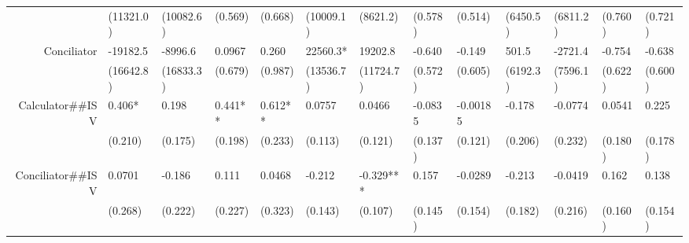 \begin{tabular}{rrrrrrrrrrrrr}
      & \multicolumn{1}{l}{(11321.0)} & \multicolumn{1}{l}{(10082.6)} & \multicolumn{1}{l}{(0.569)} & \multicolumn{1}{l}{(0.668)} & \multicolumn{1}{l}{(10009.1)} & \multicolumn{1}{l}{(8621.2)} & \multicolumn{1}{l}{(0.578)} & \multicolumn{1}{l}{(0.514)} & \multicolumn{1}{l}{(6450.5)} & \multicolumn{1}{l}{(6811.2)} & \multicolumn{1}{l}{(0.760)} & \multicolumn{1}{l}{(0.721)} \\
Conciliator & \multicolumn{1}{l}{-19182.5} & \multicolumn{1}{l}{-8996.6} & \multicolumn{1}{l}{0.0967} & \multicolumn{1}{l}{0.260} & \multicolumn{1}{l}{22560.3*} & \multicolumn{1}{l}{19202.8} & \multicolumn{1}{l}{-0.640} & \multicolumn{1}{l}{-0.149} & \multicolumn{1}{l}{501.5} & \multicolumn{1}{l}{-2721.4} & \multicolumn{1}{l}{-0.754} & \multicolumn{1}{l}{-0.638} \\
      & \multicolumn{1}{l}{(16642.8)} & \multicolumn{1}{l}{(16833.3)} & \multicolumn{1}{l}{(0.679)} & \multicolumn{1}{l}{(0.987)} & \multicolumn{1}{l}{(13536.7)} & \multicolumn{1}{l}{(11724.7)} & \multicolumn{1}{l}{(0.572)} & \multicolumn{1}{l}{(0.605)} & \multicolumn{1}{l}{(6192.3)} & \multicolumn{1}{l}{(7596.1)} & \multicolumn{1}{l}{(0.622)} & \multicolumn{1}{l}{(0.600)} \\
Calculator\#\#ISV & \multicolumn{1}{l}{0.406*} & \multicolumn{1}{l}{0.198} & \multicolumn{1}{l}{0.441**} & \multicolumn{1}{l}{0.612**} & \multicolumn{1}{l}{0.0757} & \multicolumn{1}{l}{0.0466} & \multicolumn{1}{l}{-0.0835} & \multicolumn{1}{l}{-0.00185} & \multicolumn{1}{l}{-0.178} & \multicolumn{1}{l}{-0.0774} & \multicolumn{1}{l}{0.0541} & \multicolumn{1}{l}{0.225} \\
      & \multicolumn{1}{l}{(0.210)} & \multicolumn{1}{l}{(0.175)} & \multicolumn{1}{l}{(0.198)} & \multicolumn{1}{l}{(0.233)} & \multicolumn{1}{l}{(0.113)} & \multicolumn{1}{l}{(0.121)} & \multicolumn{1}{l}{(0.137)} & \multicolumn{1}{l}{(0.121)} & \multicolumn{1}{l}{(0.206)} & \multicolumn{1}{l}{(0.232)} & \multicolumn{1}{l}{(0.180)} & \multicolumn{1}{l}{(0.178)} \\
Conciliator\#\#ISV & \multicolumn{1}{l}{0.0701} & \multicolumn{1}{l}{-0.186} & \multicolumn{1}{l}{0.111} & \multicolumn{1}{l}{0.0468} & \multicolumn{1}{l}{-0.212} & \multicolumn{1}{l}{-0.329***} & \multicolumn{1}{l}{0.157} & \multicolumn{1}{l}{-0.0289} & \multicolumn{1}{l}{-0.213} & \multicolumn{1}{l}{-0.0419} & \multicolumn{1}{l}{0.162} & \multicolumn{1}{l}{0.138} \\
      & \multicolumn{1}{l}{(0.268)} & \multicolumn{1}{l}{(0.222)} & \multicolumn{1}{l}{(0.227)} & \multicolumn{1}{l}{(0.323)} & \multicolumn{1}{l}{(0.143)} & \multicolumn{1}{l}{(0.107)} & \multicolumn{1}{l}{(0.145)} & \multicolumn{1}{l}{(0.154)} & \multicolumn{1}{l}{(0.182)} & \multicolumn{1}{l}{(0.216)} & \multicolumn{1}{l}{(0.160)} & \multicolumn{1}{l}{(0.154)} \\

\end{tabular}
